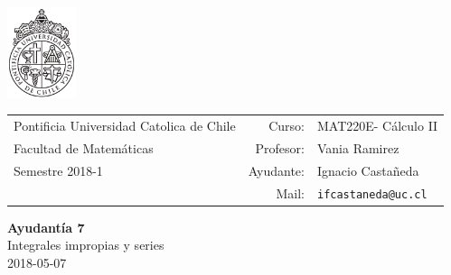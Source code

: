 \documentclass[12pt]{article}
\newcommand{\ayudantia}{{\sc Ayudantía 7}}
\newcommand{\tituloayu}{Integrales impropias y series}
\newcommand{\fecha}{2018-05-07}
\newcommand{\sigla}{MAT220E}
\newcommand{\nombre}{Cálculo II}
\newcommand{\profesor}{Vania Ramirez}
\newcommand{\ano}{2018}
\newcommand{\semestre}{1}
\begin{document}
\thispagestyle{empty}

\begin{minipage}{2cm}
	\includegraphics[width=2cm]{../../../../img/logo.pdf}
	\vspace{0.5cm}
\end{minipage}
\begin{minipage}{\linewidth}
	\begin{tabular}{lrl}
		{\scriptsize\sc Pontificia Universidad Catolica de Chile} & \hspace*{0.7in}Curso: &
		\sigla - \nombre\\
		{\sc Facultad de Matemáticas}&
		Profesor: & \profesor \\
		{\sc Semestre \ano-\semestre} & Ayudante: & {Ignacio Castañeda}\\
		& {Mail:} & \texttt{ifcastaneda@uc.cl}
	\end{tabular}
\end{minipage}

\begin{center}
	{\LARGE\bf \ayudantia}\\
	\vspace{0.1cm}
	{\tituloayu}\\
	\vspace{0.1cm}
	\fecha\\
	\vspace{0.4cm}
\end{center}
\end{document}
